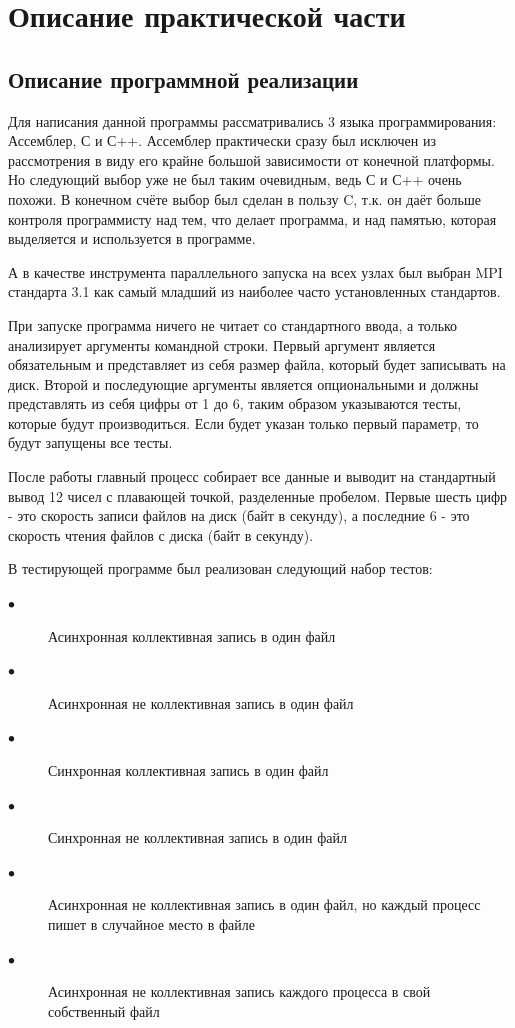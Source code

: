 \section{Описание практической части}
\label{sec:Chapter4} 

\subsection{Описание программной реализации}

Для написания данной программы рассматривались 3 языка программирования: Ассемблер, С и С++. Ассемблер
практически сразу был исключен из рассмотрения в виду его крайне большой зависимости от конечной платформы.
Но следующий выбор уже не был таким очевидным, ведь С и С++ очень похожи. В конечном счёте выбор
был сделан в пользу C, т.к. он даёт больше контроля программисту над тем, что делает программа, и
над памятью, которая выделяется и используется в программе.

А в качестве инструмента параллельного запуска на всех узлах был выбран MPI стандарта 3.1 как
самый младший из наиболее часто установленных стандартов.

При запуске программа ничего не читает со стандартного ввода, а только анализирует аргументы командной
строки. Первый аргумент является обязательным и представляет из себя размер файла, который будет
записывать на диск. Второй и последующие аргументы является опциональными и должны представлять из себя
цифры от 1 до 6, таким образом указываются тесты, которые будут производиться. Если будет указан только
первый параметр, то будут запущены все тесты.

После работы главный процесс собирает все данные и выводит на стандартный вывод 12 чисел с плавающей
точкой, разделенные пробелом. Первые шесть цифр - это скорость записи файлов на диск (байт в секунду), а
последние 6 - это скорость чтения файлов с диска (байт в секунду).

В тестирующей программе был реализован следующий набор тестов:
\begin{description}
    \item[$\bullet$] Асинхронная коллективная запись в один файл
    \item[$\bullet$] Асинхронная не коллективная запись в один файл
    \item[$\bullet$] Синхронная коллективная запись в один файл
    \item[$\bullet$] Синхронная не коллективная запись в один файл
    \item[$\bullet$] Асинхронная не коллективная запись в один файл, но каждый процесс
    пишет в случайное место в файле
    \item[$\bullet$] Асинхронная не коллективная запись каждого процесса
    в свой собственный файл
\end{description}

